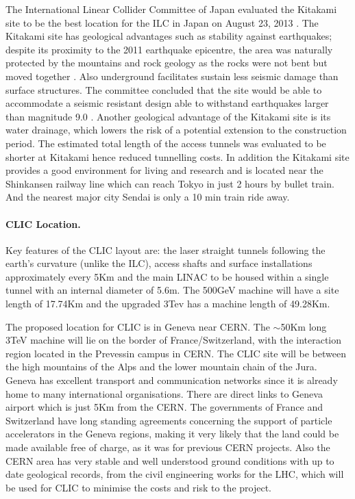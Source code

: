 The International Linear Collider Committee of Japan evaluated the Kitakami site to be the best location for the ILC in Japan on August 23, 2013 \cite{LCC:Press3}. The Kitakami site has geological advantages such as stability against earthquakes; despite its proximity to the 2011 earthquake epicentre, the area was naturally protected by the mountains and rock geology as the rocks were not bent but moved together \cite{Japan}. Also underground facilitates sustain less seismic damage than surface structures. The committee concluded that the site would be able to accommodate a seismic resistant design able to withstand earthquakes larger than magnitude 9.0 . Another geological advantage of the Kitakami site is its water drainage, which lowers the risk of a potential extension to the construction period. The estimated total length of the access tunnels was evaluated to be shorter at Kitakami hence reduced tunnelling costs. In addition \cite{ILC:FundingAgencies} the Kitakami site provides a good environment for living and research and is located near the Shinkansen railway line which can reach Tokyo in just 2 hours by bullet train. And the nearest major city Sendai is only a 10 min train ride away.

\paragraph{CLIC Location.}

Key features of the CLIC layout are: the laser straight tunnels following the earth’s curvature (unlike the ILC), access shafts and surface installations approximately every 5Km and the main LINAC to be housed within a single tunnel with an internal diameter of 5.6m. The 500GeV machine will have a site length of 17.74Km and the upgraded 3Tev has a machine length of 49.28Km. \cite{CLIC:Concept}

The proposed location for CLIC is in Geneva near CERN. The $\sim$50Km long 3TeV machine will lie on the border of France/Switzerland, with the interaction region located in the Prevessin campus in CERN. The CLIC site will be between the high mountains of the Alps and the lower mountain chain of the Jura. Geneva has excellent transport and communication networks since it is already home to many international organisations. There are direct links to Geneva airport which is just 5Km from the CERN. The governments of France and Switzerland have long standing agreements concerning the support of particle accelerators in the Geneva regions, making it very likely that the land could be made available free of charge, as it was for previous CERN projects. Also the CERN area has very stable and well understood ground conditions with up to date geological records, from the civil engineering works for the LHC, which will be used for CLIC to minimise the costs and risk to the project.

